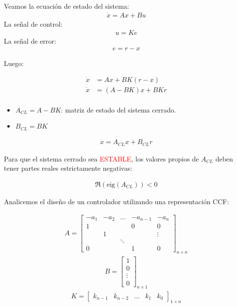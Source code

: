 \par Veamos la ecuación de estado del sistema:
\begin{align*}
    \dot{x}=Ax+Bu
\end{align*}
La señal de control:
\begin{align*}
    u=Ke
\end{align*}
La señal de error:
\begin{align*}
    e=r-x
\end{align*}

Luego:

\begin{align*}
    \dot{x} &= Ax+BK(r-x)\\
    \dot{x} &= (A-BK)x+BKr\\
\end{align*}

\begin{itemize}
    \item $A_{CL}=A-BK$: matriz de estado del sistema cerrado.
    \item $B_{CL}=BK$
\end{itemize}

\begin{align*}
    \dot{x}=A_{CL}x+B_{CL}r
\end{align*}

Para que el sistema cerrado sea \textcolor{red}{ESTABLE}, los valores propios de $A_{CL}$ deben tener partes reales estrictamente negativas:

\begin{align*}
    \Re(\text{eig}(A_{CL}))<0
\end{align*}

\par Analicemos el diseño de un controlador utilizando una representación CCF:

\begin{align*}
{A}=\left[
    \begin{array}{cccc|c}
     -a_1 & -a_2 & \dots & -a_{n-1} & -a_n\\ \hline
     1 & & & 0 & 0\\
       & 1 & & & \vdots\\
       & & \ddots & & \\
     0 & & & 1 & 0  
    \end{array}\right]_{n\times n}
\end{align*}
\begin{align*}
{B}=\left[
    \begin{array}{c}
     1 \\ \hline
     0\\
    \vdots\\
     0  
    \end{array}\right]_{n\times 1}
\end{align*}
\begin{align*}
{K}=\left[
    \begin{array}{ccccc}
     k_{n-1} & k_{n-2} & \dots & k_1 & k_0
    \end{array}\right]_{1\times n}
\end{align*}

